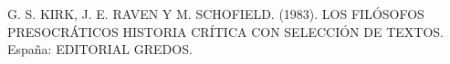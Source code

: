 G. S. KIRK, J. E. RAVEN Y M. SCHOFIELD. (1983). LOS FILÓSOFOS PRESOCRÁTICOS HISTORIA CRÍTICA CON SELECCIÓN DE TEXTOS. España: EDITORIAL GREDOS.